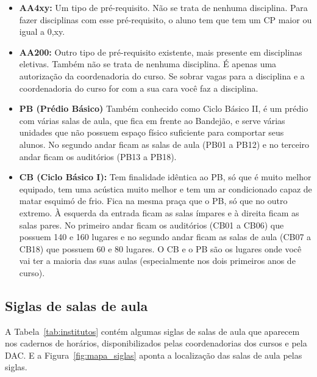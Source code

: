 \begin{itemize}
    \item  \textbf{AA4xy:} Um tipo de pré-requisito. Não se trata de nenhuma
    disciplina. Para fazer disciplinas com esse pré-requisito, o aluno tem que
    tem um CP maior ou igual a 0,xy.

    \item  \textbf{AA200:} Outro tipo de pré-requisito existente, mais presente
    em disciplinas eletivas. Também não se trata de nenhuma disciplina. É apenas
    uma autorização da coordenadoria do curso. Se sobrar vagas para a disciplina
    e a coordenadoria do curso for com a sua cara você faz a disciplina.

    \item  \textbf{PB (Prédio Básico)} Também conhecido como Ciclo Básico II,
    é um prédio com várias salas de aula, que fica em frente ao Bandejão,
    e serve várias unidades que não possuem espaço físico suficiente para
    comportar seus alunos. No segundo andar ficam as salas de aula (PB01 a PB12)
    e no terceiro andar ficam os auditórios (PB13 a PB18).

    \item  \textbf{CB (Ciclo Básico I):} Tem finalidade idêntica ao PB, só que
    é muito melhor equipado, tem uma acústica muito melhor e tem um ar
    condicionado capaz de matar esquimó de frio. Fica na mesma praça que o PB,
    só que no outro extremo. À esquerda da entrada ficam as salas ímpares
    e à direita ficam as salas pares. No primeiro andar ficam os auditórios
    (CB01 a CB06) que possuem 140 e 160 lugares e no segundo andar ficam as
    salas de aula (CB07 a CB18) que possuem 60 e 80 lugares.  O CB e o PB são os
    lugares onde você vai ter a maioria das suas aulas (especialmente nos dois
    primeiros anos de curso).

\end{itemize}

\subsection{Siglas de salas de aula}

A Tabela~\ref{tab:institutos} contém algumas siglas de salas de aula que aparecem nos cadernos
de horários, disponibilizados pelas coordenadorias dos cursos e pela DAC. E a Figura~\ref{fig:mapa_siglas} aponta a localização das salas de aula pelas siglas.

